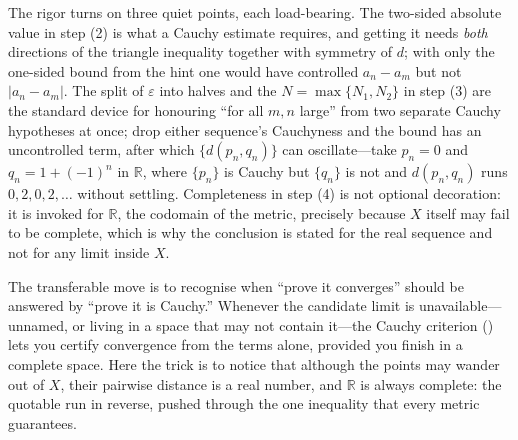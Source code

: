 \documentclass[main.tex]{subfiles}
\begin{document}
\begin{Reflection}
The rigor turns on three quiet points, each load-bearing. The two-sided absolute value in step (2) is
what a Cauchy estimate requires, and getting it needs \emph{both} directions of the triangle
inequality together with symmetry of $d$; with only the one-sided bound from the hint one would have
controlled $a_{n}-a_{m}$ but not $|a_{n}-a_{m}|$. The split of $\varepsilon$ into halves and the
$N=\max\{N_{1},N_{2}\}$ in step (3) are the standard device for honouring ``for all $m,n$ large'' from
two separate Cauchy hypotheses at once; drop either sequence's Cauchyness and the bound has an
uncontrolled term, after which $\{d(p_{n},q_{n})\}$ can oscillate---take $p_{n}=0$ and
$q_{n}=1+(-1)^{n}$ in $\mathbb R$, where $\{p_{n}\}$ is Cauchy but $\{q_{n}\}$ is not and
$d(p_{n},q_{n})$ runs $0,2,0,2,\dots$ without settling. Completeness in step (4) is
not optional decoration: it is invoked for $\mathbb R$, the codomain of the metric, precisely because
$X$ itself may fail to be complete, which is why the conclusion is stated for the real sequence and not
for any limit inside $X$.

The transferable move is to recognise when ``prove it converges'' should be answered by ``prove it is
Cauchy.'' Whenever the candidate limit is unavailable---unnamed, or living in a space that may not
contain it---the Cauchy criterion () lets you certify convergence from the terms alone,
provided you finish in a complete space. Here the trick is to notice that although the points may
wander out of $X$, their pairwise distance is a real number, and $\mathbb R$ is always complete: the
quotable  run in reverse,
pushed through the one inequality that every metric guarantees.
\end{Reflection}
\end{document}
